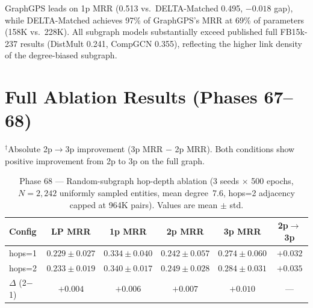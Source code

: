 \documentclass{article}
\begin{document}
GraphGPS leads on 1p MRR (0.513 vs.\ DELTA-Matched 0.495, $-0.018$ gap), while DELTA-Matched achieves 97\% of GraphGPS's MRR at 69\% of parameters (158K vs.\ 228K). All subgraph models substantially exceed published full FB15k-237 results (DistMult 0.241, CompGCN 0.355), reflecting the higher link density of the degree-biased subgraph.

\section{Full Ablation Results (Phases 67--68)}
\label{app:ablation_full}

\begin{table}[h]
\small
\centering
\caption{Phase 67 --- Full FB15k-237 hop-depth ablation (3 seeds $\times$ 200 epochs, top-$k$=128 sparse attention, 1,064K parameters). Values are mean $\pm$ std across all 3 seeds. 2p/3p queries use 10,000 samples each.}
\label{tab:phase67}
\vspace{1pt}
{\small $^\dagger$Absolute 2p$\to$3p improvement (3p MRR $-$ 2p MRR). Both conditions show positive improvement from 2p to 3p on the full graph.}
\end{table}

\begin{table}[h]
\small
\centering
\caption{Phase 68 --- Random-subgraph hop-depth ablation (3 seeds $\times$ 500 epochs, $N{=}2{,}242$ uniformly sampled entities, mean degree~7.6, hops=2 adjacency capped at 964K pairs). Values are mean $\pm$ std.}
\label{tab:phase68}
\begin{tabular}{@{}lccccc@{}}
\toprule
\textbf{Config} & \textbf{LP MRR} & \textbf{1p MRR} & \textbf{2p MRR} & \textbf{3p MRR} & \textbf{2p$\to$3p} \\
\midrule
hops=1 & $0.229\pm0.027$ & $0.334\pm0.040$ & $0.242\pm0.057$ & $0.274\pm0.060$ & $+0.032$ \\
hops=2 & $0.233\pm0.019$ & $0.340\pm0.017$ & $0.249\pm0.028$ & $0.284\pm0.031$ & $+0.035$ \\
\midrule
$\Delta$ (2$-$1) & $+0.004$ & $+0.006$ & $+0.007$ & $+0.010$ & --- \\
\bottomrule
\end{tabular}
\end{table}
\end{document}
